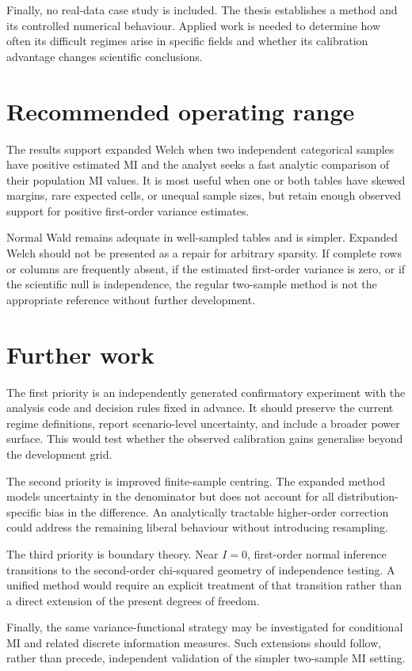 Finally, no real-data case study is included. The thesis establishes a method
and its controlled numerical behaviour. Applied work is needed to determine
how often its difficult regimes arise in specific fields and whether its
calibration advantage changes scientific conclusions.

\section{Recommended operating range}

The results support expanded Welch when two independent categorical samples
have positive estimated MI and the analyst seeks a fast analytic comparison
of their population MI values. It is most useful when one or both tables have
skewed margins, rare expected cells, or unequal sample sizes, but retain enough
observed support for positive first-order variance estimates.

Normal Wald remains adequate in well-sampled tables and is simpler. Expanded
Welch should not be presented as a repair for arbitrary sparsity. If complete
rows or columns are frequently absent, if the estimated first-order variance
is zero, or if the scientific null is independence, the regular two-sample
method is not the appropriate reference without further development.

\section{Further work}

The first priority is an independently generated confirmatory experiment with
the analysis code and decision rules fixed in advance. It should preserve the
current regime definitions, report scenario-level uncertainty, and include a
broader power surface. This would test whether the observed calibration gains
generalise beyond the development grid.

The second priority is improved finite-sample centring. The expanded method
models uncertainty in the denominator but does not account for all
distribution-specific bias in the difference. An analytically tractable
higher-order correction could address the remaining liberal behaviour without
introducing resampling.

The third priority is boundary theory. Near $I=0$, first-order normal
inference transitions to the second-order chi-squared geometry of
independence testing. A unified method would require an explicit treatment of
that transition rather than a direct extension of the present degrees of
freedom.

Finally, the same variance-functional strategy may be investigated for
conditional MI and related discrete information measures. Such extensions
should follow, rather than precede, independent validation of the simpler
two-sample MI setting.
